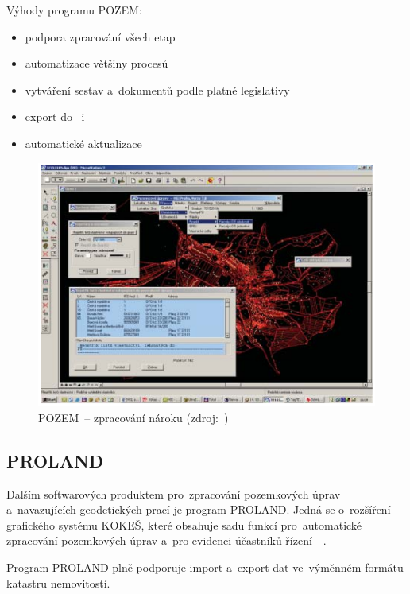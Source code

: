 Výhody programu POZEM: \vspace{-\topsep}
	\begin{itemize}[leftmargin=1.5cm, noitemsep]
		\item podpora zpracování všech etap 
		\item automatizace většiny procesů 
		\item vytváření sestav a~dokumentů podle platné
legislativy
		\item export do~ i~
		\item automatické aktualizace
	\end{itemize}

	\begin{figure}[H] \centering
		\includegraphics[width=.8\textwidth]{./pictures/pozem.png}
		\caption[POZEM~– zpracování nároku]{POZEM~– zpracování
nároku (zdroj:~\cite{pozem})}
		\label{fig:pozem_obrazek}
 	\end{figure}

\subsection{PROLAND}
\label{proland}

Dalším softwarových produktem pro~zpracování pozemkových úprav
a~navazujících geodetických prací je program PROLAND. Jedná se
o~rozšíření grafického systému KOKEŠ, které obsahuje sadu funkcí
pro~automatické zpracování pozemkových úprav a~pro evidenci účastníků
řízení~\citep{proland}~\citep{pu_skripta}.

Program PROLAND plně podporuje import a~export dat ve~výměnném formátu
katastru nemovitostí.

